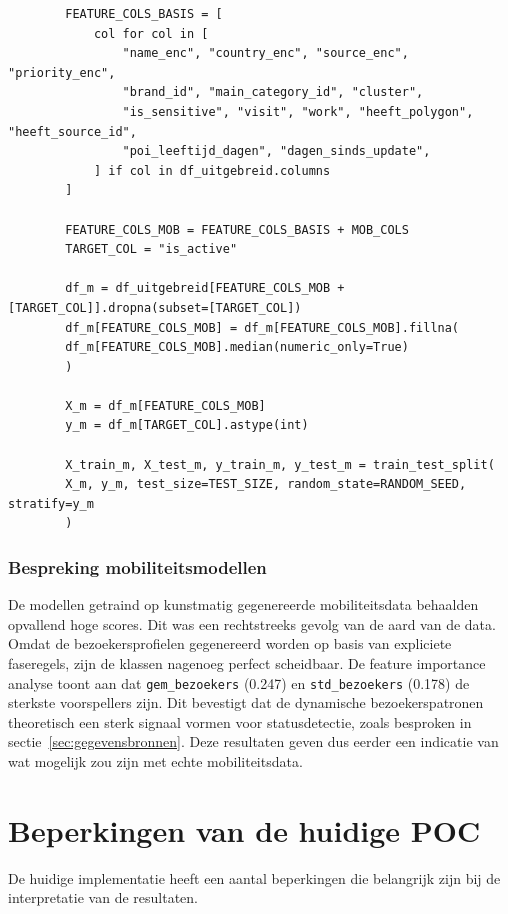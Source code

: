 \begin{listing}[H]
    \begin{verbatim}
        FEATURE_COLS_BASIS = [
            col for col in [
                "name_enc", "country_enc", "source_enc", "priority_enc",
                "brand_id", "main_category_id", "cluster",
                "is_sensitive", "visit", "work", "heeft_polygon", "heeft_source_id",
                "poi_leeftijd_dagen", "dagen_sinds_update",
            ] if col in df_uitgebreid.columns
        ]
        
        FEATURE_COLS_MOB = FEATURE_COLS_BASIS + MOB_COLS
        TARGET_COL = "is_active"
        
        df_m = df_uitgebreid[FEATURE_COLS_MOB + [TARGET_COL]].dropna(subset=[TARGET_COL])
        df_m[FEATURE_COLS_MOB] = df_m[FEATURE_COLS_MOB].fillna(
        df_m[FEATURE_COLS_MOB].median(numeric_only=True)
        )
        
        X_m = df_m[FEATURE_COLS_MOB]
        y_m = df_m[TARGET_COL].astype(int)
        
        X_train_m, X_test_m, y_train_m, y_test_m = train_test_split(
        X_m, y_m, test_size=TEST_SIZE, random_state=RANDOM_SEED, stratify=y_m
        )
    \end{verbatim}
    \caption[Train/test-splitsing mobiliteitsmodellen]{Opbouw van de feature set en gelaagde splitsing voor de mobiliteitsmodellen.}
\end{listing}

\subsubsection{Bespreking mobiliteitsmodellen}
De modellen getraind op kunstmatig gegenereerde mobiliteitsdata behaalden opvallend hoge scores. Dit was een rechtstreeks gevolg van de aard van de data. Omdat de bezoekersprofielen gegenereerd worden op basis van expliciete faseregels, zijn de klassen nagenoeg perfect scheidbaar. De feature importance analyse toont aan dat \texttt{gem\_bezoekers} (0.247) en \texttt{std\_bezoekers} (0.178) de sterkste voorspellers zijn. Dit bevestigt dat de dynamische bezoekerspatronen theoretisch een sterk signaal vormen voor statusdetectie, zoals besproken in sectie~\ref{sec:gegevensbronnen}. Deze resultaten geven dus eerder een indicatie van wat mogelijk zou zijn met echte mobiliteitsdata.

\section{Beperkingen van de huidige POC}
De huidige implementatie heeft een aantal beperkingen die belangrijk zijn bij de interpretatie van de resultaten.

